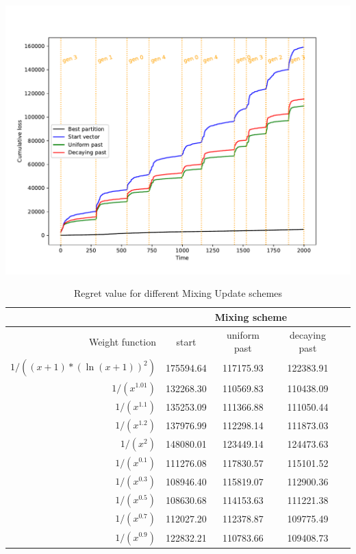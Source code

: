 \documentclass[12pt, twoside]{article}
\begin{document}
\includegraphics[width=\linewidth]{fig_52}

\begin{table}[h]
\centering
\begin{tabular}{r|cccc}
 & \multicolumn{3}{c}{Mixing scheme} \\
\toprule
{Weight function} & \centering start & \centering uniform past & \centering decaying past &  \\
\midrule
$1 / ((x + 1) * (\ln(x + 1))^2)$ & 175594.64 & 117175.93 & 122383.91 \\
$1 / (x^{1.01})$ & 132268.30 & 110569.83 & 110438.09 \\
$1 / (x^{1.1})$ & 135253.09 & 111366.88 & 111050.44 \\
$1 / (x^{1.2})$ & 137976.99 & 112298.14 & 111873.03 \\
$1 / (x^2)$ & 148080.01 & 123449.14 & 124473.63 \\
$1 / (x^{0.1})$ & 111276.08 & 117830.57 & 115101.52 \\
$1 / (x^{0.3})$ & 108946.40 & 115819.07 & 112900.36 \\
$1 / (x^{0.5})$ & 108630.68 & 114153.63 & 111221.38 \\
$1 / (x^{0.7})$ & 112027.20 & 112378.87 & 109775.49 \\
$1 / (x^{0.9})$ & 122832.21 & 110783.66 & 109408.73 \\
\bottomrule
\end{tabular}
\caption{Regret value for different Mixing Update schemes}
\end{table}
\end{document}

